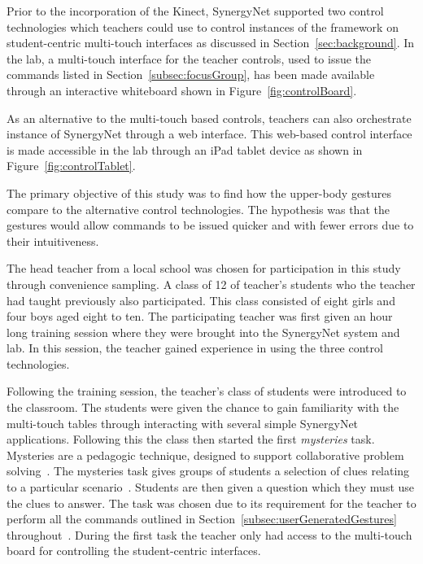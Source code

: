 \documentclass[link]{IWCOMP}
\begin{document}
Prior to the incorporation of the Kinect, SynergyNet supported two control technologies which teachers could use to control instances of the framework on student-centric multi-touch interfaces as discussed in Section~\ref{sec:background}.
In the lab, a multi-touch interface for the teacher controls, used to issue the commands listed in Section~\ref{subsec:focusGroup}, has been made available through an interactive whiteboard shown in Figure~\ref{fig:controlBoard}.

As an alternative to the multi-touch based controls, teachers can also orchestrate instance of SynergyNet through a web interface.
This web-based control interface is made accessible in the lab through an iPad tablet device as shown in Figure~\ref{fig:controlTablet}.

The primary objective of this study was to find how the upper-body gestures compare to the alternative control technologies.
The hypothesis was that the gestures would allow commands to be issued quicker and with fewer errors due to their intuitiveness.

The head teacher from a local school was chosen for participation in this study through convenience sampling.
A class of 12 of teacher's students who the teacher had taught previously also participated.
This class consisted of eight girls and four boys aged eight to ten.
The participating teacher was first given an hour long training session where they were brought into the SynergyNet system and lab.  
In this session, the teacher gained experience in using the three control technologies.

Following the training session, the teacher's class of students were introduced to the classroom.
The students were given the chance to gain familiarity with the multi-touch tables through interacting with several simple SynergyNet applications.
Following this the class then started the first \textit{mysteries} task.
Mysteries are a pedagogic technique, designed to support collaborative problem solving~\cite{Leat2002}.
The mysteries task gives groups of students a selection of clues relating to a particular scenario~\cite{Higgins2011b}.
Students are then given a question which they must use the clues to answer.
The task was chosen due to its requirement for the teacher to perform all the commands outlined in Section~\ref{subsec:userGeneratedGestures} throughout~\cite{Mercier2012}.
During the first task the teacher only had access to the multi-touch board for controlling the student-centric interfaces.
\end{document}
